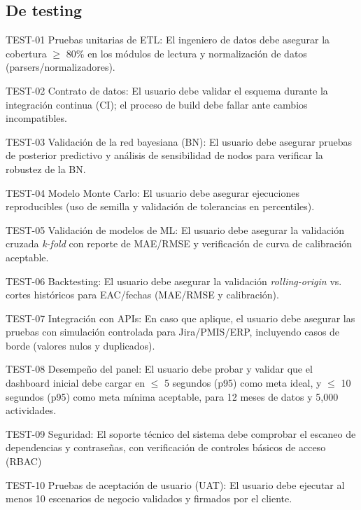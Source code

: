 \documentclass[12pt]
{charter}
\begin{document}
\subsection{De testing}
\begin{description}
  \item TEST-01 Pruebas unitarias de ETL: El ingeniero de datos debe asegurar la cobertura $\geq$ 80\% en los módulos de lectura y normalización de datos (parsers/normalizadores).

  \item TEST-02 Contrato de datos: El usuario debe validar el esquema durante la integración continua (CI); el proceso de build debe fallar ante cambios incompatibles.

  \item TEST-03 Validación de la red bayesiana (BN): El usuario debe asegurar pruebas de posterior predictivo y análisis de sensibilidad de nodos para verificar la robustez de la BN.

  \item TEST-04 Modelo Monte Carlo: El usuario debe asegurar ejecuciones reproducibles (uso de semilla y validación de tolerancias en percentiles).

  \item TEST-05 Validación de modelos de ML: El usuario debe asegurar la validación cruzada \textit{k-fold} con reporte de MAE/RMSE y verificación de curva de calibración aceptable.

  \item TEST-06 Backtesting: El usuario debe asegurar la validación \textit{rolling-origin} vs. cortes históricos para EAC/fechas (MAE/RMSE y calibración).

  \item TEST-07 Integración con APIs: En caso que aplique, el usuario debe asegurar las pruebas con simulación controlada para Jira/PMIS/ERP, incluyendo casos de borde (valores nulos y duplicados).

  \item TEST-08 Desempeño del panel: El usuario debe probar y validar que el dashboard inicial debe cargar en $\leq$ 5 segundos (p95) como meta ideal, y $\leq$ 10 segundos (p95) como meta mínima aceptable, para 12 meses de datos y 5,000 actividades.

  \item TEST-09 Seguridad: El soporte técnico del sistema debe comprobar el escaneo de dependencias y contraseñas, con verificación de controles básicos de acceso (RBAC)

  \item TEST-10 Pruebas de aceptación de usuario (UAT): El usuario debe ejecutar al menos 10 escenarios de negocio validados y firmados por el cliente.

\end{description}
\end{document}
